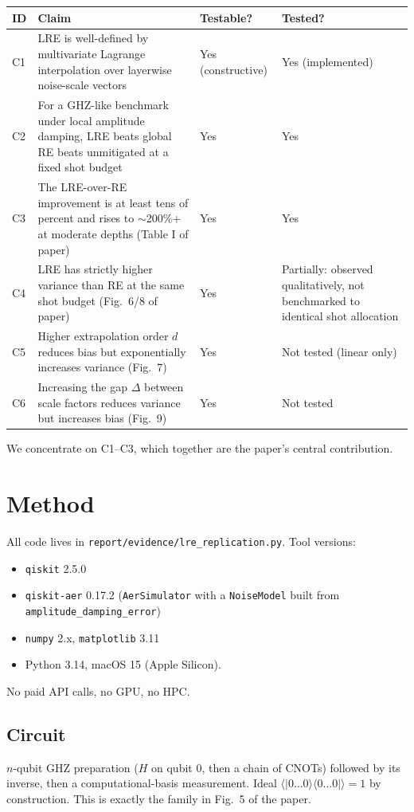 \documentclass[11pt]{article}
\begin{document}
\begin{center}
\begin{tabular}{llll}
\toprule
ID & Claim & Testable? & Tested? \\
\midrule
C1 & LRE is well-defined by multivariate Lagrange interpolation over
      layerwise noise-scale vectors & Yes (constructive) & Yes (implemented) \\
C2 & For a GHZ-like benchmark under local amplitude damping,
      LRE beats global RE beats unmitigated at a fixed shot budget & Yes & Yes \\
C3 & The LRE-over-RE improvement is at least tens of percent and rises to
      $\sim$200\%+ at moderate depths (Table I of paper) & Yes & Yes \\
C4 & LRE has strictly higher variance than RE at the same shot budget
      (Fig.\ 6/8 of paper) & Yes & Partially: observed qualitatively, not
      benchmarked to identical shot allocation \\
C5 & Higher extrapolation order $d$ reduces bias but exponentially increases
      variance (Fig.\ 7) & Yes & Not tested (linear only) \\
C6 & Increasing the gap $\Delta$ between scale factors reduces variance
      but increases bias (Fig.\ 9) & Yes & Not tested \\
\bottomrule
\end{tabular}
\end{center}

We concentrate on C1--C3, which together are the paper's central contribution.

\section{Method}
\label{sec:method}

All code lives in \texttt{report/evidence/lre\_replication.py}. Tool versions:
\begin{itemize}
  \item \texttt{qiskit} 2.5.0
  \item \texttt{qiskit-aer} 0.17.2 (\texttt{AerSimulator} with a \texttt{NoiseModel}
        built from \texttt{amplitude\_damping\_error})
  \item \texttt{numpy} 2.x, \texttt{matplotlib} 3.11
  \item Python 3.14, macOS 15 (Apple Silicon).
\end{itemize}
No paid API calls, no GPU, no HPC.

\subsection{Circuit}
$n$-qubit GHZ preparation ($H$ on qubit 0, then a chain of CNOTs) followed by its inverse,
then a computational-basis measurement. Ideal $\langle |0\dots0\rangle\langle 0\dots0|\rangle = 1$
by construction. This is exactly the family in Fig.\ 5 of the paper.
\end{document}

